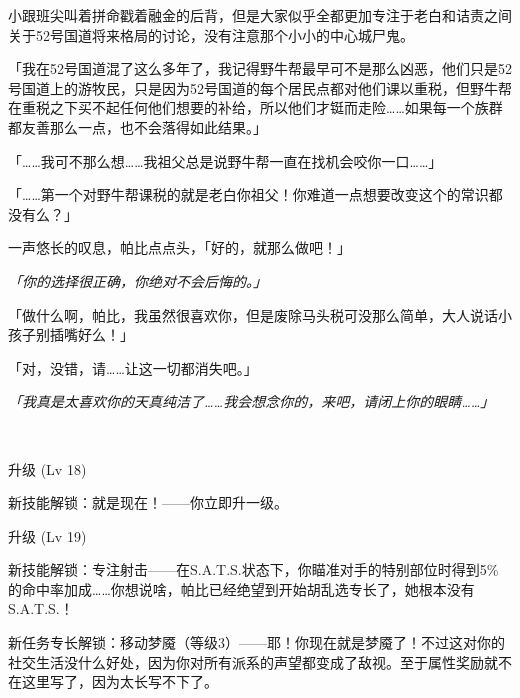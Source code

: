 小跟班尖叫着拼命戳着融金的后背，但是大家似乎全都更加专注于老白和诘责之间关于52号国道将来格局的讨论，没有注意那个小小的中心城尸鬼。

「我在52号国道混了这么多年了，我记得野牛帮最早可不是那么凶恶，他们只是52号国道上的游牧民，只是因为52号国道的每个居民点都对他们课以重税，但野牛帮在重税之下买不起任何他们想要的补给，所以他们才铤而走险……如果每一个族群都友善那么一点，也不会落得如此结果。」

「……我可不那么想……我祖父总是说野牛帮一直在找机会咬你一口……」

「……第一个对野牛帮课税的就是老白你祖父！你难道一点想要改变这个的常识都没有么？」

一声悠长的叹息，帕比点点头，「好的，就那么做吧！」

\emph{「你的选择很正确，你绝对不会后悔的。」}

「做什么啊，帕比，我虽然很喜欢你，但是废除马头税可没那么简单，大人说话小孩子别插嘴好么！」

「对，没错，请……让这一切都消失吧。」

\emph{「我真是太喜欢你的天真纯洁了……我会想念你的，来吧，请闭上你的眼睛……」}

~\vfill

\begin{note}
    升级 (Lv 18) 

    新技能解锁：就是现在！——你立即升一级。

\end{note}

\begin{note}
    升级 (Lv 19) 

    新技能解锁：专注射击——在S.A.T.S.状态下，你瞄准对手的特别部位时得到5\%的命中率加成……你想说啥，帕比已经绝望到开始胡乱选专长了，她根本没有S.A.T.S.！

    新任务专长解锁：移动梦魇（等级3）——耶！你现在就是梦魇了！不过这对你的社交生活没什么好处，因为你对所有派系的声望都变成了敌视。至于属性奖励就不在这里写了，因为太长写不下了。
\end{note}


